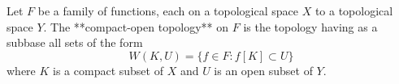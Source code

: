 Let $F$ be a family of functions, each on a topological space $X$ to a topological space $Y$. The **compact-open topology** on $F$ is the topology having as a subbase all sets of the form
$$W(K, U) = \{f \in F : f[K] \subset U\}$$
where $K$ is a compact subset of $X$ and $U$ is an open subset of $Y$.
